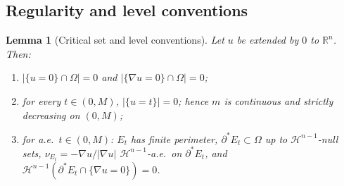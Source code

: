 \documentclass[11pt]{amsart}
\newtheorem{lemma}[theorem]{Lemma}
\theoremstyle{definition}
\newcommand{\R}{\mathbb R}
\newcommand{\Om}{\Omega}
\newcommand{\Hn}{\mathcal H^{n-1}}
\begin{document}
\subsection*{Regularity and level conventions}

\begin{lemma}[Critical set and level conventions]\label{lem:id-noatoms}
Let \(u\) be extended by \(0\) to \(\R^n\).  Then:
\begin{enumerate}[label=\textup{(\alph*)},leftmargin=2.2em]
\item \(|\{u=0\}\cap\Om|=0\) and \(|\{\nabla u=0\}\cap\Om|=0\);
\item for every \(t\in(0,M)\), \(|\{u=t\}|=0\); hence \(m\) is continuous and
strictly decreasing on \((0,M)\);
\item for a.e.\ \(t\in(0,M)\): \(E_t\) has finite perimeter,
\(\partial^*E_t\subset\Om\) up to \(\Hn\)-null sets,
\(\nu_{E_t}=-\nabla u/|\nabla u|\) \(\Hn\)-a.e.\ on \(\partial^*E_t\), and
\(\Hn(\partial^*E_t\cap\{\nabla u=0\})=0\).
\end{enumerate}
\end{lemma}
\end{document}
